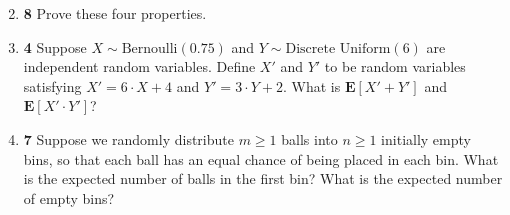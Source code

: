 \documentclass[12pt]{article}
\theoremstyle{plain}
\theoremstyle{definition}
\theoremstyle{remark}
\renewcommand{\Pr}{\textbf{Pr}}
\newcommand{\E}{\textbf{E}}
\newcommand{\pts}[1]{\lbrack\textbf{#1}\rbrack}
\begin{document}
\begin{enumerate}
\setcounter{enumi}{1}

\item \pts{8} Prove these four properties.

\begin{comment}\begin{tcolorbox}
Let $p_i:=\Pr[X=X_i]$ and $q_j:=\Pr[Y=Y_j]$.

\begin{itemize}
\item $\E[c\cdot X]=\sum_i(c\cdot X_i)\cdot p_i=c\cdot\left(\sum_iX_i\cdot p_i\right)=c\cdot\E[X]$.

\item $\E[c+X]=\sum_i(c+X_i)\cdot p_i=c\cdot\sum_ip_i+\sum_iX_i\cdot p_i=c+\E[X]$.

\item $\E[X\cdot Y]=\sum_{i,j}(X_i\cdot Y_j)\cdot\Pr[X=X_i\cap Y=Y_j]=\sum_{i,j}X_i\cdot Y_j\cdot p_i\cdot q_j=(\sum_iX_i\cdot p_i)\cdot(\sum_jY_j\cdot q_j)=\E[X]\cdot\E[Y]$.

\item $\E[X+Y]=\sum_{i,j}(X_i+Y_j)\cdot\Pr[X=X_i\cap Y=Y_j]=\sum_i\sum_jX_i\cdot\Pr[X=X_i\cap Y=Y_j]+\sum_j\sum_iY_j\cdot\Pr[X=X_i\cap Y=Y_j]=\sum_iX_i\cdot p_i+\sum_jY_j\cdot q_j=\E[X]+\E[Y]$.
\end{itemize}
\end{tcolorbox}
\end{comment}

\item \pts{4} Suppose $X\sim\text{Bernoulli}(0.75)$ and $Y\sim\text{Discrete Uniform}(6)$ are independent random variables. Define $X'$ and $Y'$ to be random variables satisfying $X'=6\cdot X+4$ and $Y'=3\cdot Y+2$. What is $\E[X'+Y']$ and $\E[X'\cdot Y']$?

\begin{comment}\begin{tcolorbox}
We have $\E[X]=0\cdot0.25+1\cdot0.75=\frac34$ and $\E[Y]=1\cdot\frac16+2\cdot\frac16+\dots+6\cdot\frac16=\frac72$. Thus $\E[X']=\E[6\cdot X+4]=6\cdot\E[X]+4=\frac{17}2$ and $\E[Y']=\E[3\cdot Y+2]=3\cdot\E[Y]+2=\frac{25}2$. We have $\E[X'+Y']=\E[X']+\E[Y']=\frac{17}2+\frac{25}2=21$, and since $X'\perp Y'$, we know $\E[X'\cdot Y']=\E[X']\cdot\E[Y']=\frac{17}2\cdot\frac{25}2=\frac{425}4$.
\end{tcolorbox}
\end{comment}

\item \pts{7} Suppose we randomly distribute $m\ge1$ balls into $n\ge1$ initially empty bins, so that each ball has an equal chance of being placed in each bin. What is the expected number of balls in the first bin? What is the expected number of empty bins?


\end{enumerate}
\end{document}
